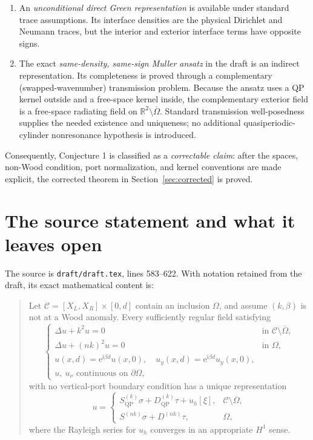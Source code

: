 \documentclass[11pt]{article}
\newcommand{\C}{\mathcal C}
\newcommand{\Om}{\Omega}
\newcommand{\R}{\mathbb R}
\newcommand{\ii}{\mathrm i}
\newcommand{\ee}{\mathrm e}
\newcommand{\QP}{\mathrm{QP}}
\theoremstyle{plain}
\theoremstyle{definition}
\theoremstyle{remark}
\begin{document}
\begin{enumerate}
\item An \emph{unconditional direct Green representation} is available under
standard trace assumptions.  Its interface densities are the physical
Dirichlet and Neumann traces, but the interior and exterior interface terms
have opposite signs.
\item The exact \emph{same-density, same-sign Muller ansatz} in the draft is an
indirect representation.  Its completeness is proved through a complementary
(swapped-wavenumber) transmission problem.  Because the ansatz uses a QP kernel
outside and a free-space kernel inside, the complementary exterior field is a
free-space radiating field on \(\R^2\setminus\overline\Om\).  Standard
transmission well-posedness supplies the needed existence and uniqueness; no
additional quasiperiodic-cylinder nonresonance hypothesis is introduced.
\end{enumerate}

Consequently, Conjecture 1 is classified as a \emph{correctable claim}: after
the spaces, non-Wood condition, port normalization, and kernel conventions are
made explicit, the corrected theorem in Section~\ref{sec:corrected} is proved.

\section{The source statement and what it leaves open}
\label{sec:source}

The source is \texttt{draft/draft.tex}, lines 583--622.  With notation retained
from the draft, its exact mathematical content is:

\begin{quote}
Let \(\C=[X_L,X_R]\times[0,d]\) contain an inclusion \(\Om\), and assume
\((k,\beta)\) is not at a Wood anomaly.  Every sufficiently regular field
satisfying
\[
\begin{cases}
\Delta u+k^2u=0&\text{in }\C\setminus\overline\Om,\\
\Delta u+(nk)^2u=0&\text{in }\Om,\\
u(x,d)=\ee^{\ii\beta d}u(x,0),\quad
u_y(x,d)=\ee^{\ii\beta d}u_y(x,0),\\
u,\ u_\nu\text{ continuous on }\partial\Om,
\end{cases}
\]
with no vertical-port boundary condition has a unique representation
\[
u=\begin{cases}
S_{\QP}^{(k)}\sigma+D_{\QP}^{(k)}\tau+u_h[\xi],
&\C\setminus\overline\Om,\\
S^{(nk)}\sigma+D^{(nk)}\tau,&\Om,
\end{cases}
\]
where the Rayleigh series for \(u_h\) converges in an appropriate \(H^1\)
sense.
\end{quote}
\end{document}
